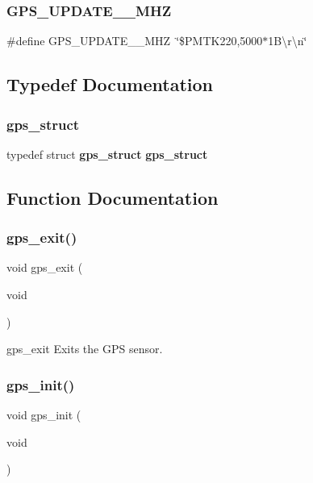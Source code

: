 \mbox{\label{gps_8h_acc2b1e38199628cf759fb78c3c793f4a}} 
\subsubsection{G\+P\+S\+\_\+\+U\+P\+D\+A\+T\+E\+\_\+\_\+\+M\+HZ}
{\footnotesize\ttfamily \#define G\+P\+S\+\_\+\+U\+P\+D\+A\+T\+E\+\_\+\_\+\+M\+HZ~\char`\"{}\$P\+M\+T\+K220,5000$\ast$1\+B\textbackslash{}r\textbackslash{}n\char`\"{}}



\subsection{Typedef Documentation}
\mbox{\label{gps_8h_ab232414422f09e758dd2da0a3546e48c}} 
\subsubsection{gps\+\_\+struct}
{\footnotesize\ttfamily typedef struct \textbf{ gps\+\_\+struct}  \textbf{ gps\+\_\+struct}}



\subsection{Function Documentation}
\mbox{\label{gps_8h_a4dc3078b60b9efb9fc6fdd0a5493a878}} 
\subsubsection{gps\+\_\+exit()}
{\footnotesize\ttfamily void gps\+\_\+exit (\begin{DoxyParamCaption}\item[{void}]{ }\end{DoxyParamCaption})}

gps\+\_\+exit Exits the G\+PS sensor. \mbox{\label{gps_8h_ab37f7040b9efd19fdd3f92b1df77e771}} 
\subsubsection{gps\+\_\+init()}
{\footnotesize\ttfamily void gps\+\_\+init (\begin{DoxyParamCaption}\item[{void}]{ }\end{DoxyParamCaption})}

